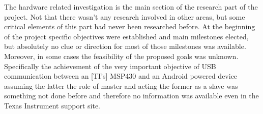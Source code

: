 
	The hardware related investigation is the main section of the research part of the project. Not that there wasn't any research involved in other areas, but some critical elements of this part had never been researched before. 
	At the beginning of the project specific objectives were established and main milestones elected, but absolutely no clue or direction for most of those milestones was available.
	Moreover, in some cases the feasibility of the proposed goals was unknown. Specifically the achievement of the very important objective of USB communication between an [TI's] MSP430 %
	and an Android powered device assuming the latter the role of master and acting the former as a slave was something not done before and therefore no information was available  even in the Texas Instrument support site.\\




